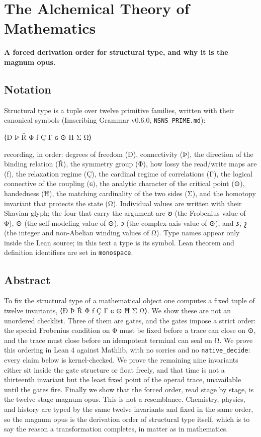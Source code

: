 \hypertarget{the-alchemical-theory-of-mathematics}{%
\section{The Alchemical Theory of
Mathematics}\label{the-alchemical-theory-of-mathematics}}

\textbf{A forced derivation order for structural type, and why it is the
magnum opus.}

\hypertarget{notation}{%
\subsection{Notation}\label{notation}}

Structural type is a tuple over twelve primitive families, written with
their canonical symbols (Imscribing Grammar v0.6.0,
\texttt{NSNS\_PRIME.md}):

⟨Ð Þ Ř Φ ƒ Ç Γ ɢ ⊙ Ħ Σ Ω⟩

recording, in order: degrees of freedom (Ð), connectivity (Þ), the
direction of the binding relation (Ř), the symmetry group (Φ), how lossy
the read/write maps are (ƒ), the relaxation regime (Ç), the cardinal
regime of correlations (Γ), the logical connective of the coupling (ɢ),
the analytic character of the critical point (⊙), handedness (Ħ), the
matching cardinality of the two sides (Σ), and the homotopy invariant
that protects the state (Ω). Individual values are written with their
Shavian glyph; the four that carry the argument are 𐑹 (the Frobenius
value of Φ), ⊙ (the self-modeling value of ⊙), 𐑮 (the complex-axis value
of ⊙), and 𐑭, 𐑟 (the integer and non-Abelian winding values of Ω). Type
names appear only inside the Lean source; in this text a type is its
symbol. Lean theorem and definition identifiers are set in
\texttt{monospace}.

\hypertarget{abstract}{%
\subsection{Abstract}\label{abstract}}

To fix the structural type of a mathematical object one computes a fixed
tuple of twelve invariants, ⟨Ð Þ Ř Φ ƒ Ç Γ ɢ ⊙ Ħ Σ Ω⟩. We show these are
not an unordered checklist. Three of them are gates, and the gates
impose a strict order: the special Frobenius condition on Φ must be
fixed before a trace can close on ⊙, and the trace must close before an
idempotent terminal can seal on Ω. We prove this ordering in Lean 4
against Mathlib, with no sorries and no \texttt{native\_decide}: every
claim below is kernel-checked. We prove the remaining nine invariants
either sit inside the gate structure or float freely, and that time is
not a thirteenth invariant but the least fixed point of the operad
trace, unavailable until the gates fire. Finally we show that the forced
order, read stage by stage, is the twelve stage magnum opus. This is not
a resemblance. Chemistry, physics, and history are typed by the same
twelve invariants and fixed in the same order, so the magnum opus is the
derivation order of structural type itself, which is to say the reason a
transformation completes, in matter as in mathematics.

